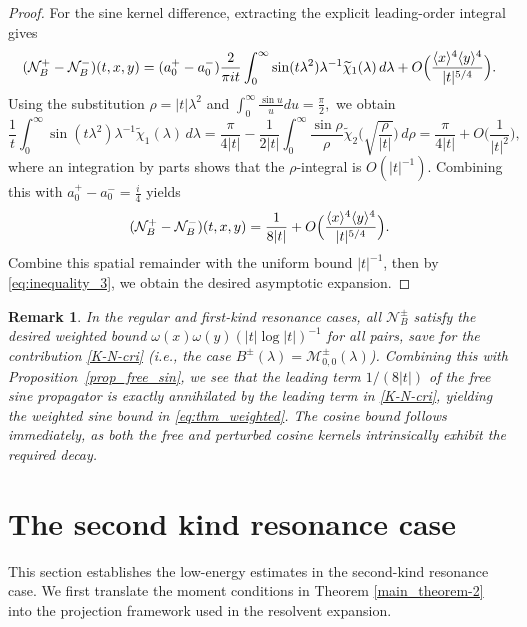 \documentclass[reqno]{amsart}
\newtheorem{remark}[theorem]{Remark}
\numberwithin{equation}{section}
\begin{document}
\begin{proof}
	For the sine kernel difference, extracting the explicit leading-order integral gives
	$$
	\begin{aligned}
		(\mathcal{N}_{B}^+ - \mathcal{N}_{B}^-)(t,x,y) = (a_0^+ - a_0^-) \frac{2}{\pi i t} \int_0^\infty \sin(t\lambda^2) \lambda^{-1} \widetilde{\chi}_1(\lambda) \, d\lambda + O\Bigl(\frac{\langle x\rangle^4\langle y\rangle^4}{|t|^{5/4}}\Bigr).
	\end{aligned}
	$$
	Using the substitution $\rho = |t|\lambda^2$ and $\int_0^\infty \frac{\sin u}{u} du = \frac{\pi}{2},$  we obtain
	\begin{equation}\label{eq:integral_sin}
		\frac{1}{t}\int_0^{\infty} \sin(t\lambda^2) \lambda^{-1} \widetilde{\chi}_1(\lambda) \, d\lambda
		= \frac{\pi}{4|t|}
		- \frac{1}{2|t|} \int_0^{\infty} \frac{\sin\rho}{\rho}  \widetilde{\chi}_2\bigl(\sqrt{\frac{\rho}{|t|}}\bigr) \, d\rho=\frac{\pi}{4|t|}+O\bigl(\frac{1}{|t|^{2}}\bigr),
	\end{equation}
	where an integration by parts shows that the $\rho$-integral is   $O(|t|^{-1})$.
	Combining this with $a_0^{+} -a_0^{-}= \frac{i}{4}$ yields
	$$
	(\mathcal{N}_{B}^+ - \mathcal{N}_{B}^-)(t,x,y)=\frac{1}{8 |t|}+ O\Bigl(\frac{\langle x\rangle^4\langle y\rangle^4}{|t|^{5/4}}\Bigr).
	$$
	Combine this spatial remainder with the uniform bound $|t|^{-1}$, then by \eqref{eq:inequality_3}, we  obtain  the desired asymptotic expansion.
\end{proof}
\begin{remark}
{\rm
In the regular and first-kind resonance cases, all $\mathcal{N}_{B}^\pm$ satisfy the desired weighted bound $\omega(x)\omega(y)(|t|\log|t|)^{-1}$ for all pairs, save for the  contribution \eqref{K-N-cri} (i.e., the case $B^\pm(\lambda)=\mathcal{M}_{0,0}^\pm(\lambda)$).
Combining this with Proposition~\ref{prop_free_sin}, we see that the leading term ${1}/{(8|t|)}$ of the free sine propagator is exactly annihilated by the leading term in \eqref{K-N-cri}, yielding the weighted sine bound in \eqref{eq:thm_weighted}. The  cosine bound follows immediately, as both the free and perturbed cosine kernels
intrinsically exhibit the required decay.}
\end{remark}


\section{The second kind resonance case}\label{sec:second}
This section establishes the low-energy estimates in the
second-kind resonance case. We first translate the moment conditions
in Theorem \ref{main_theorem-2} into the projection framework used
in the resolvent expansion.
\end{document}
